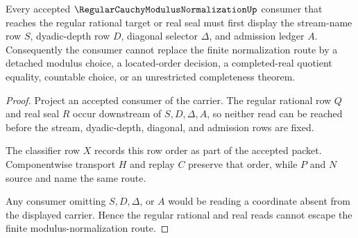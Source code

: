 \begin{theorem}
\label{thm:regular-cauchy-modulus-normalization-nonescape-boundary}
Every accepted $\RegularCauchyModulusNormalizationUp$ consumer that reaches the regular rational target or real seal must first display the stream-name row $S$, dyadic-depth row $D$, diagonal selector $\Delta$, and admission ledger $A$. Consequently the consumer cannot replace the finite normalization route by a detached modulus choice, a located-order decision, a completed-real quotient equality, countable choice, or an unrestricted completeness theorem.
\end{theorem}
\begin{proof}
Project an accepted consumer of the carrier. The regular rational row $Q$ and real seal $R$ occur downstream of $S,D,\Delta,A$, so neither read can be reached before the stream, dyadic-depth, diagonal, and admission rows are fixed.

The classifier row $X$ records this row order as part of the accepted packet. Componentwise transport $H$ and replay $C$ preserve that order, while $P$ and $N$ source and name the same route.

Any consumer omitting $S,D,\Delta$, or $A$ would be reading a coordinate absent from the displayed carrier. Hence the regular rational and real reads cannot escape the finite modulus-normalization route.
\end{proof}




